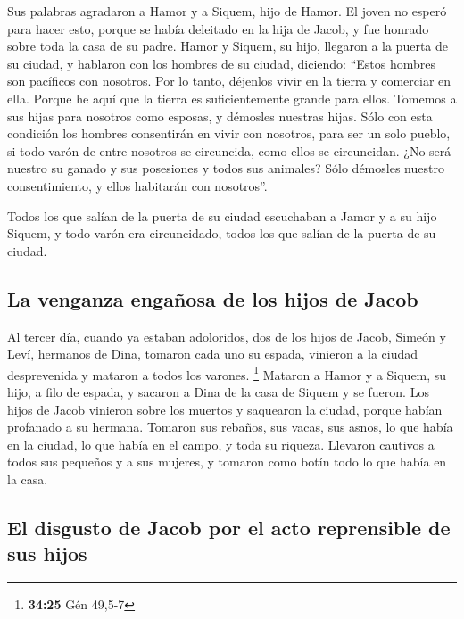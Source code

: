 \begin{paracol}{2}
 Sus palabras agradaron a Hamor y a Siquem, hijo de
Hamor.  El joven no esperó para hacer esto, porque se
había deleitado en la hija de Jacob, y fue honrado sobre toda la casa de
su padre.  Hamor y Siquem, su hijo, llegaron a la puerta
de su ciudad, y hablaron con los hombres de su ciudad, diciendo:
 ``Estos hombres son pacíficos con nosotros. Por lo
tanto, déjenlos vivir en la tierra y comerciar en ella. Porque he aquí
que la tierra es suficientemente grande para ellos. Tomemos a sus hijas
para nosotros como esposas, y démosles nuestras hijas. 
Sólo con esta condición los hombres consentirán en vivir con nosotros,
para ser un solo pueblo, si todo varón de entre nosotros se circuncida,
como ellos se circuncidan.  ¿No será nuestro su ganado y
sus posesiones y todos sus animales? Sólo démosles nuestro
consentimiento, y ellos habitarán con nosotros''.

 Todos los que salían de la puerta de su ciudad
escuchaban a Jamor y a su hijo Siquem, y todo varón era circuncidado,
todos los que salían de la puerta de su ciudad.

\hypertarget{la-venganza-engauxf1osa-de-los-hijos-de-jacob}{%
\subsection{La venganza engañosa de los hijos de
Jacob}\label{la-venganza-engauxf1osa-de-los-hijos-de-jacob}}

 Al tercer día, cuando ya estaban adoloridos, dos de los
hijos de Jacob, Simeón y Leví, hermanos de Dina, tomaron cada uno su
espada, vinieron a la ciudad desprevenida y mataron a todos los varones.
\footnote{\textbf{34:25} Gén 49,5-7}  Mataron a Hamor y a
Siquem, su hijo, a filo de espada, y sacaron a Dina de la casa de Siquem
y se fueron.  Los hijos de Jacob vinieron sobre los
muertos y saquearon la ciudad, porque habían profanado a su hermana.
 Tomaron sus rebaños, sus vacas, sus asnos, lo que había
en la ciudad, lo que había en el campo,  y toda su
riqueza. Llevaron cautivos a todos sus pequeños y a sus mujeres, y
tomaron como botín todo lo que había en la casa.

\hypertarget{el-disgusto-de-jacob-por-el-acto-reprensible-de-sus-hijos}{%
\subsection{El disgusto de Jacob por el acto reprensible de sus
hijos}\label{el-disgusto-de-jacob-por-el-acto-reprensible-de-sus-hijos}}


\end{paracol}
